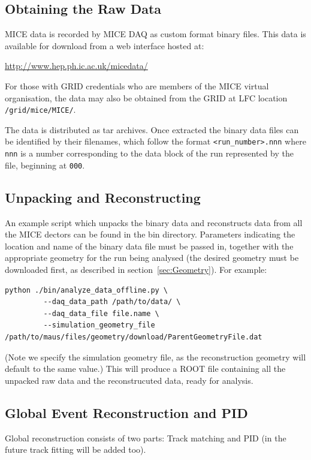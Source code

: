 \documentclass[a4paper,10pt]{article}
\begin{document}
  \subsection{Obtaining the Raw Data}
    MICE data is recorded by MICE DAQ as custom format binary files.  This data is available for download from a web interface hosted at:

    \medskip
    \url{http://www.hep.ph.ic.ac.uk/micedata/}
    \medskip

    For those with GRID credentials who are members of the MICE virtual organisation, the data may also be obtained from the GRID at LFC location \texttt{/grid/mice/MICE/}.

    The data is distributed as tar archives. Once extracted the binary data files can be identified by their filenames, which follow the format \texttt{<run\_number>.nnn} where \texttt{nnn} is a number corresponding to the data block of the run represented by the file, beginning at \texttt{000}.

  \subsection{Unpacking and Reconstructing}
    An example script which unpacks the binary data and reconstructs data from all the MICE dectors can be found in the bin directory.  Parameters indicating the location and name of the binary data file must be passed in, together with the appropriate geometry for the run being analysed (the desired geometry must be downloaded first, as described in section~\ref{sec:Geometry}).  For example:
    \begin{lstlisting}
python ./bin/analyze_data_offline.py \
         --daq_data_path /path/to/data/ \
         --daq_data_file file.name \
         --simulation_geometry_file /path/to/maus/files/geometry/download/ParentGeometryFile.dat
    \end{lstlisting}
    (Note we specify the simulation geometry file, as the reconstruction geometry will default to the same value.) This will produce a ROOT file containing all the unpacked raw data and the reconstrucuted data, ready for analysis.

\subsection{Global Event Reconstruction and PID}
\label{sec:GlobalAnalysis}

Global reconstruction consists of two parts: Track matching and PID (in the future track fitting will be added too).  
\end{document}

